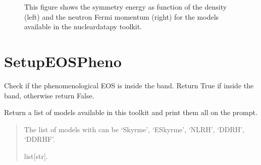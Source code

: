 \documentclass[letterpaper,10pt,english]{sphinxmanual}
\begin{document}
\begin{figure}[htbp]
\centering
\capstart

\noindent{}
\caption{This figure shows the symmetry energy as function of the density (left) and the neutron Fermi momentum (right) for the models available in the nucleardatapy toolkit.}\label{\detokenize{source/api/setup_matter_micro_esym:id1}}\end{figure}

\sphinxstepscope


\section{SetupEOSPheno}
\label{\detokenize{source/api/setup_matter_pheno:setupeospheno}}\label{\detokenize{source/api/setup_matter_pheno::doc}}\label{\detokenize{source/api/setup_matter_pheno:module-nucleardatapy.matter.setup_pheno}}

\begin{fulllineitems}
\label{\detokenize{source/api/setup_matter_pheno:nucleardatapy.matter.setup_pheno.checkPheno}}
\pysigstartsignatures
{}
\pysigstopsignatures
\sphinxAtStartPar
Check if the phenomenological EOS is inside the band.
Return True if inside the band, otherwise return False.

\end{fulllineitems}


\begin{fulllineitems}
\label{\detokenize{source/api/setup_matter_pheno:nucleardatapy.matter.setup_pheno.pheno_models}}
\pysigstartsignatures
{}
\pysigstopsignatures
\sphinxAtStartPar
Return a list of models available in this toolkit and print them all on the prompt.
\begin{quote}\begin{description}
\sphinxAtStartPar
The list of models with can be ‘Skyrme’, ‘ESkyrme’, ‘NLRH’, ‘DDRH’, ‘DDRHF’.

\sphinxAtStartPar
list{[}str{]}.

\end{description}\end{quote}

\end{fulllineitems}
\end{document}
